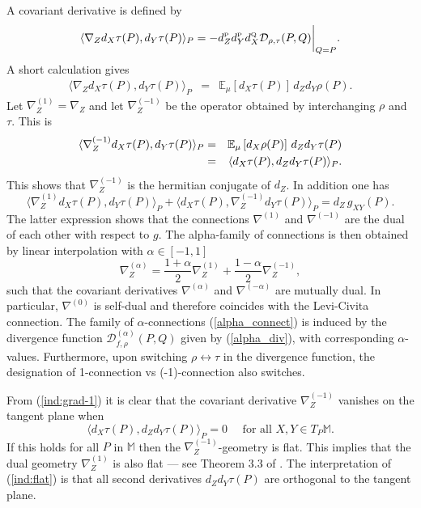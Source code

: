 \documentclass[graybox]{svmult}
\newcommand{\be}{\begin{equation}}
\newcommand{\ee}{\end{equation}}
\newcommand{\beq}{\begin{eqnarray}}
\newcommand{\eeq}{\end{eqnarray}}
\newcommand{\Mo}{\mathbb M}
\newcommand{\Eo}{\mathbb E}
\newcommand{\Ddiv}{\mathcal{D}}
\newcommand{\Dfrechet}{d}  %
\begin{document}
A covariant derivative is defined by
\be
\langle \nabla_Z\Dfrechet_X\tau(P),\Dfrechet_Y\tau(P)\rangle_P
=
-\Dfrechet^{\mbox{\tiny P}}_Z
\Dfrechet^{\mbox{\tiny P}}_Y\Dfrechet^{\mbox{\tiny Q}}_X \Ddiv _{\rho,\tau}(P,Q)
\bigg|_{Q=P}.
\nonumber
\ee
A short calculation gives
\beq
\langle\nabla_Z\Dfrechet_X\tau(P),\Dfrechet_Y\tau(P)\rangle_P
&=&
\Eo_\mu \left[\Dfrechet_X\tau(P)\right]
\,\Dfrechet_Z\Dfrechet_Y\rho(P).
\nonumber
\eeq
Let $\nabla^{(1)}_Z=\nabla_Z$ and let $\nabla_Z^{(-1)}$ be the operator
obtained by interchanging $\rho$ and $\tau$.
This is
\beq
\langle\nabla_Z^{(-1)}\Dfrechet_X\tau(P),\Dfrechet_Y\tau(P)\rangle_P
&=&
\Eo_\mu \left[\Dfrechet_X\rho(P)\right]
\,\Dfrechet_Z\Dfrechet_Y\tau(P)\cr
&=&
\langle \Dfrechet_X\tau(P)
,\Dfrechet_Z\Dfrechet_Y\tau(P)\rangle_P.
\label{ind:grad-1}
\eeq
This shows that $\nabla_Z^{(-1)}$ is the hermitian conjugate of $\Dfrechet_Z$.
In addition one has
\be
\langle\nabla_Z^{(1)}\Dfrechet_X\tau(P),\Dfrechet_Y\tau(P)\rangle_P
+\langle\Dfrechet_X\tau(P),\nabla_Z^{(-1)}\Dfrechet_Y\tau(P)\rangle_P
=\Dfrechet_Z\, g_{XY}(P).
\label{ind:dual}
\ee
The latter expression shows that the connections $\nabla^{(1)}$
and $\nabla^{(-1)}$ are the dual of each other with respect to $g$.
%
The alpha-family of connections is then obtained by linear interpolation with $\alpha \in [-1,1]$
\be \label{alpha_connect}
\nabla^{(\alpha)}_Z=\frac{1+\alpha}{2}\nabla^{(1)}_Z+\frac{1-\alpha}{2}\nabla^{(-1)}_Z ,
\ee
such that the covariant derivatives $\nabla^{(\alpha)}$ and $\nabla^{(-\alpha)}$ are mutually dual. 
In particular, $\nabla^{(0)}$ is self-dual and therefore coincides with the Levi-Civita
connection. The family of $\alpha$-connections (\ref{alpha_connect}) is induced by the divergence function
$\Ddiv^{(\alpha)}_{f, \rho}(P,Q)$ given by (\ref{alpha_div}), with corresponding $\alpha$-values. Furthermore, upon switching $\rho \leftrightarrow \tau$ in the divergence function, the designation of 1-connection vs (-1)-connection also switches. 

From (\ref {ind:grad-1}) it is clear that the covariant derivative $\nabla_Z^{(-1)}$
vanishes on the tangent plane when
\be
\langle \Dfrechet_X\tau(P)
,\Dfrechet_Z\Dfrechet_Y\tau(P)\rangle_P=0
\quad\mbox{ for all }X,Y\in T_P\Mo.
\label{ind:flat}
\ee
If this holds for all $P$ in $\Mo$ then the $\nabla_Z^{(-1)}$-geometry is flat.
This implies that the dual geometry $\nabla_Z^{(1)}$ is also flat --- see Theorem 3.3 of \cite{amarinagaoka2000}.
The interpretation of (\ref {ind:flat}) is that all second derivatives
$\Dfrechet_Z\Dfrechet_Y\tau(P)$ are orthogonal to the tangent plane.
\end{document}
